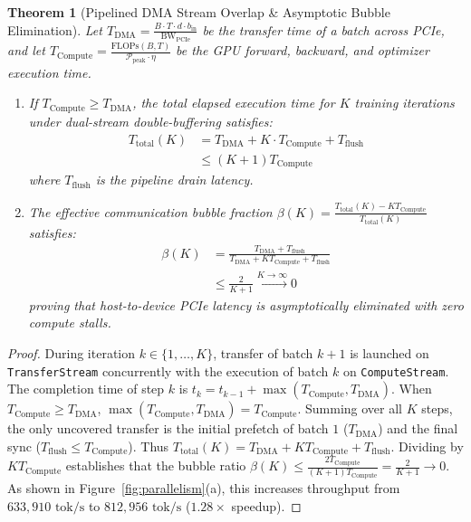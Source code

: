 \documentclass[10pt,twocolumn,letterpaper]{article}
\newtheorem{theorem}{Theorem}
\begin{document}
\begin{theorem}[Pipelined DMA Stream Overlap \& Asymptotic Bubble Elimination]
\label{thm:dma_overlap}
Let $T_{\text{DMA}} = \frac{B \cdot T \cdot d \cdot b_{\text{in}}}{\text{BW}_{\text{PCIe}}}$ be the transfer time of a batch across PCIe, and let $T_{\text{Compute}} = \frac{\text{FLOPs}(B, T)}{\mathcal{P}_{\text{peak}} \cdot \eta}$ be the GPU forward, backward, and optimizer execution time.
\begin{enumerate}
    \item If $T_{\text{Compute}} \ge T_{\text{DMA}}$, the total elapsed execution time for $K$ training iterations under dual-stream double-buffering satisfies:
    \begin{equation}
    \begin{aligned}
        T_{\text{total}}(K) &= T_{\text{DMA}} + K \cdot T_{\text{Compute}} + T_{\text{flush}} \\
        &\le (K+1) T_{\text{Compute}}
    \end{aligned}
    \end{equation}
    where $T_{\text{flush}}$ is the pipeline drain latency.
    \item The effective communication bubble fraction $\beta(K) = \frac{T_{\text{total}}(K) - K T_{\text{Compute}}}{T_{\text{total}}(K)}$ satisfies:
    \begin{equation}
    \begin{aligned}
        \beta(K) &= \frac{T_{\text{DMA}} + T_{\text{flush}}}{T_{\text{DMA}} + K T_{\text{Compute}} + T_{\text{flush}}} \\
        &\le \frac{2}{K+1} \xrightarrow{K \to \infty} 0
    \end{aligned}
    \end{equation}
    proving that host-to-device PCIe latency is asymptotically eliminated with zero compute stalls.
\end{enumerate}
\end{theorem}

\begin{proof}
During iteration $k \in \{1, \dots, K\}$, transfer of batch $k+1$ is launched on \texttt{TransferStream} concurrently with the execution of batch $k$ on \texttt{ComputeStream}. The completion time of step $k$ is $t_k = t_{k-1} + \max(T_{\text{Compute}}, T_{\text{DMA}})$. When $T_{\text{Compute}} \ge T_{\text{DMA}}$, $\max(T_{\text{Compute}}, T_{\text{DMA}}) = T_{\text{Compute}}$. Summing over all $K$ steps, the only uncovered transfer is the initial prefetch of batch $1$ ($T_{\text{DMA}}$) and the final sync ($T_{\text{flush}} \le T_{\text{Compute}}$). Thus $T_{\text{total}}(K) = T_{\text{DMA}} + K T_{\text{Compute}} + T_{\text{flush}}$.
Dividing by $K T_{\text{Compute}}$ establishes that the bubble ratio $\beta(K) \le \frac{2 T_{\text{Compute}}}{(K+1) T_{\text{Compute}}} = \frac{2}{K+1} \to 0$. As shown in Figure~\ref{fig:parallelism}(a), this increases throughput from $633,910\text{ tok/s}$ to \textbf{$812,956\text{ tok/s}$} ($1.28\times$ speedup).
\end{proof}
\end{document}
